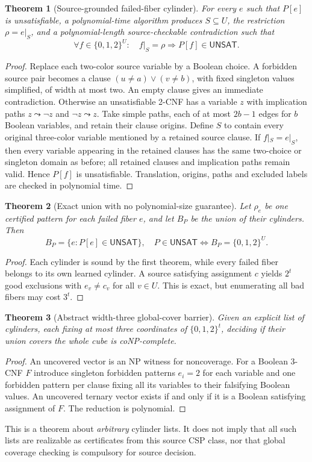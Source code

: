 \documentclass[11pt]{article}
\newtheorem{theorem}{Theorem}
\begin{document}
\begin{theorem}[Source-grounded failed-fiber cylinder]
For every $e$ such that $P[e]$ is unsatisfiable, a polynomial-time algorithm produces $S\subseteq U$, the restriction $\rho=e|_S$, and a polynomial-length source-checkable contradiction such that
\[
\forall f\in\{0,1,2\}^{U}:\quad f|_S=\rho\Longrightarrow P[f]\in\mathsf{UNSAT}.
\]
\end{theorem}
\begin{proof}
Replace each two-color source variable by a Boolean choice. A forbidden source pair becomes a clause $(u\ne a)\vee(v\ne b)$, with fixed singleton values simplified, of width at most two. An empty clause gives an immediate contradiction. Otherwise an unsatisfiable 2-CNF has a variable $z$ with implication paths $z\leadsto\neg z$ and $\neg z\leadsto z$. Take simple paths, each of at most $2b-1$ edges for $b$ Boolean variables, and retain their clause origins. Define $S$ to contain every original three-color variable mentioned by a retained source clause. If $f|_S=e|_S$, then every variable appearing in the retained clauses has the same two-choice or singleton domain as before; all retained clauses and implication paths remain valid. Hence $P[f]$ is unsatisfiable. Translation, origins, paths and excluded labels are checked in polynomial time. 
\end{proof}

\begin{theorem}[Exact union with no polynomial-size guarantee]
Let $\rho_e$ be one certified pattern for each failed fiber $e$, and let $B_P$ be the union of their cylinders. Then
\[
B_P=\{e:P[e]\in\mathsf{UNSAT}\},\quad
P\in\mathsf{UNSAT}\iff B_P=\{0,1,2\}^U.
\]
\end{theorem}
\begin{proof}
Each cylinder is sound by the first theorem, while every failed fiber belongs to its own learned cylinder. A source satisfying assignment $c$ yields $2^t$ good exclusions with $e_v\ne c_v$ for all $v\in U$. This is exact, but enumerating all bad fibers may cost $3^t$.
\end{proof}

\begin{theorem}[Abstract width-three global-cover barrier]
Given an explicit list of cylinders, each fixing at most three coordinates of $\{0,1,2\}^t$, deciding if their union covers the whole cube is coNP-complete.
\end{theorem}
\begin{proof}
An uncovered vector is an NP witness for noncoverage. For a Boolean 3-CNF $F$ introduce singleton forbidden patterns $e_i=2$ for each variable and one forbidden pattern per clause fixing all its variables to their falsifying Boolean values. An uncovered ternary vector exists if and only if it is a Boolean satisfying assignment of $F$. The reduction is polynomial.
\end{proof}
\noindent This is a theorem about \emph{arbitrary} cylinder lists. It does not imply that all such lists are realizable as certificates from this source CSP class, nor that global coverage checking is compulsory for source decision.
\end{document}
